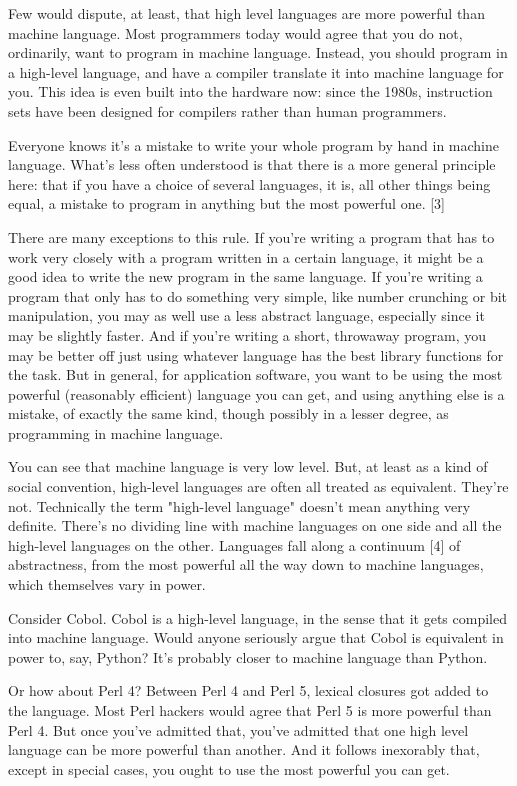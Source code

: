 \documentclass[10pt,twoside,openright]{memoir}
\begin{document}
Few would dispute, at least, that high level languages are more powerful than machine language. Most programmers today would agree that you do not, ordinarily, want to program in machine language. Instead, you should program in a high-level language, and have a compiler translate it into machine language for you. This idea is even built into the hardware now: since the 1980s, instruction sets have been designed for compilers rather than human programmers.

Everyone knows it's a mistake to write your whole program by hand in machine language. What's less often understood is that there is a more general principle here: that if you have a choice of several languages, it is, all other things being equal, a mistake to program in anything but the most powerful one. [3]

There are many exceptions to this rule. If you're writing a program that has to work very closely with a program written in a certain language, it might be a good idea to write the new program in the same language. If you're writing a program that only has to do something very simple, like number crunching or bit manipulation, you may as well use a less abstract language, especially since it may be slightly faster. And if you're writing a short, throwaway program, you may be better off just using whatever language has the best library functions for the task. But in general, for application software, you want to be using the most powerful (reasonably efficient) language you can get, and using anything else is a mistake, of exactly the same kind, though possibly in a lesser degree, as programming in machine language.

You can see that machine language is very low level. But, at least as a kind of social convention, high-level languages are often all treated as equivalent. They're not. Technically the term "high-level language" doesn't mean anything very definite. There's no dividing line with machine languages on one side and all the high-level languages on the other. Languages fall along a continuum [4] of abstractness, from the most powerful all the way down to machine languages, which themselves vary in power.

Consider Cobol. Cobol is a high-level language, in the sense that it gets compiled into machine language. Would anyone seriously argue that Cobol is equivalent in power to, say, Python? It's probably closer to machine language than Python.

Or how about Perl 4? Between Perl 4 and Perl 5, lexical closures got added to the language. Most Perl hackers would agree that Perl 5 is more powerful than Perl 4. But once you've admitted that, you've admitted that one high level language can be more powerful than another. And it follows inexorably that, except in special cases, you ought to use the most powerful you can get.
\end{document}
